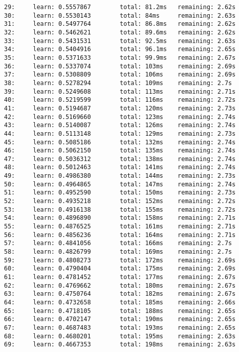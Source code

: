 \documentclass[11pt]{article}
\begin{document}
\begin{Verbatim}[commandchars=\\\{\}]
29:     learn: 0.5557867        total: 81.2ms   remaining: 2.62s
30:     learn: 0.5530143        total: 84ms     remaining: 2.63s
31:     learn: 0.5497764        total: 86.8ms   remaining: 2.62s
32:     learn: 0.5462621        total: 89.6ms   remaining: 2.62s
33:     learn: 0.5431531        total: 92.5ms   remaining: 2.63s
34:     learn: 0.5404916        total: 96.1ms   remaining: 2.65s
35:     learn: 0.5371633        total: 99.9ms   remaining: 2.67s
36:     learn: 0.5337074        total: 103ms    remaining: 2.69s
37:     learn: 0.5308809        total: 106ms    remaining: 2.69s
38:     learn: 0.5278294        total: 109ms    remaining: 2.7s
39:     learn: 0.5249608        total: 113ms    remaining: 2.71s
40:     learn: 0.5219599        total: 116ms    remaining: 2.72s
41:     learn: 0.5194687        total: 120ms    remaining: 2.73s
42:     learn: 0.5169660        total: 123ms    remaining: 2.74s
43:     learn: 0.5140087        total: 126ms    remaining: 2.74s
44:     learn: 0.5113148        total: 129ms    remaining: 2.73s
45:     learn: 0.5085186        total: 132ms    remaining: 2.74s
46:     learn: 0.5062150        total: 135ms    remaining: 2.74s
47:     learn: 0.5036312        total: 138ms    remaining: 2.74s
48:     learn: 0.5012463        total: 141ms    remaining: 2.74s
49:     learn: 0.4986380        total: 144ms    remaining: 2.73s
50:     learn: 0.4964865        total: 147ms    remaining: 2.74s
51:     learn: 0.4952590        total: 150ms    remaining: 2.73s
52:     learn: 0.4935218        total: 152ms    remaining: 2.72s
53:     learn: 0.4916138        total: 155ms    remaining: 2.72s
54:     learn: 0.4896890        total: 158ms    remaining: 2.71s
55:     learn: 0.4876525        total: 161ms    remaining: 2.71s
56:     learn: 0.4856236        total: 164ms    remaining: 2.71s
57:     learn: 0.4841056        total: 166ms    remaining: 2.7s
58:     learn: 0.4826799        total: 169ms    remaining: 2.7s
59:     learn: 0.4808273        total: 172ms    remaining: 2.69s
60:     learn: 0.4790404        total: 175ms    remaining: 2.69s
61:     learn: 0.4781452        total: 177ms    remaining: 2.67s
62:     learn: 0.4769662        total: 180ms    remaining: 2.67s
63:     learn: 0.4750764        total: 182ms    remaining: 2.67s
64:     learn: 0.4732658        total: 185ms    remaining: 2.66s
65:     learn: 0.4718105        total: 188ms    remaining: 2.65s
66:     learn: 0.4702147        total: 190ms    remaining: 2.65s
67:     learn: 0.4687483        total: 193ms    remaining: 2.65s
68:     learn: 0.4680201        total: 195ms    remaining: 2.63s
69:     learn: 0.4667353        total: 198ms    remaining: 2.63s

\end{Verbatim}
\end{document}
